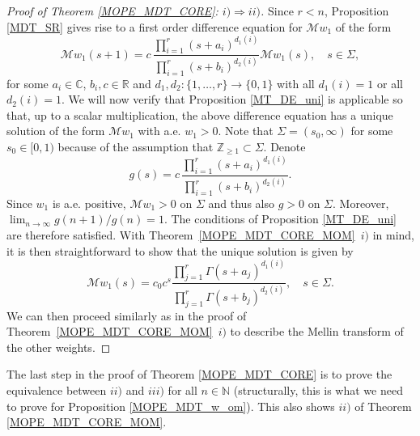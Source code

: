\documentclass[a4paper,12pt,oneside]{article}
\theoremstyle{definition}
\newcommand{\N}{\mathbb{N}}
\newcommand{\Z}{\mathbb{Z}}
\newcommand{\C}{\mathbb{C}}
\newcommand{\R}{\mathbb{R}}
\newcommand{\MT}[1]{\mathcal{M}#1}
\begin{document}
\begin{proof}[Proof of Theorem \ref{MOPE_MDT_CORE}: $i)\Rightarrow ii)$]
    Since $r<n$, Proposition \ref{MDT_SR} gives rise to a first order difference equation for $\MT{w_1}$ of the form
        $$ \MT{w}_1(s+1) = c \, \frac{\prod_{i=1}^{r} (s+a_i)^{d_1(i)}}{\prod_{i=1}^{r} (s+b_i)^{d_2(i)}} \MT{w}_1(s),\quad s\in\Sigma,$$
     for some $a_i\in\C$, $b_i,c\in\R$ and $d_1,d_2:\{1,\dots,r\}\to \{0,1\}$ with all $d_1(i)=1$ or all $d_2(i)=1$. We will now verify that Proposition \ref{MT_DE_uni} is applicable so that, up to a scalar multiplication, the above difference equation has a unique solution of the form $\MT{w}_1$ with a.e. $w_1>0$. Note that $\Sigma=(s_0,\infty)$ for some $s_0\in[0,1)$ because of the assumption that $\Z_{\geq 1}\subset \Sigma$. Denote 
        $$ g(s) =  c \, \frac{\prod_{i=1}^{r} (s+a_i)^{d_1(i)}}{\prod_{i=1}^{r} (s+b_i)^{d_2(i)}}. $$
     Since $w_1$ is a.e. positive, $\MT{w_1}>0$ on $\Sigma$ and thus also $g>0$ on $\Sigma$. Moreover, $\lim_{n\to\infty} g(n+1)/g(n) = 1$. The conditions of Proposition \ref{MT_DE_uni} are therefore satisfied. With  Theorem~\ref{MOPE_MDT_CORE_MOM}~$i)$ in mind, it is then straightforward to show that the unique solution is given by
    $$ \MT{w}_1(s) = c_0 c^s \frac{\prod_{j=1}^{r} \Gamma(s+a_j)^{d_1(i)}}{\prod_{j=1}^{r} \Gamma(s+b_j)^{d_2(i)}},\quad s\in\Sigma.$$
    We can then proceed similarly as in the proof of Theorem~\ref{MOPE_MDT_CORE_MOM}~$i)$ to describe the Mellin transform of the other weights.
\end{proof}

The last step in the proof of Theorem \ref{MOPE_MDT_CORE} is to prove the equivalence between $ii)$ and $iii)$ for all $n\in\N$ (structurally, this is what we need to prove for Proposition \ref{MOPE_MDT_w_om}). This also shows $ii)$ of Theorem \ref{MOPE_MDT_CORE_MOM}.
\end{document}
